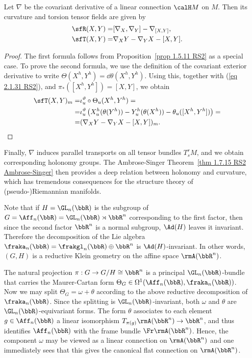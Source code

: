 \begin{prop}[{{\cite[Prop.~2.1.19]{RS2}}}]\label{prop 2.1.19 RS2}
    Let $\nabla$ be the covariant derivative of a linear connection $\calH M$ on $M$. Then its curvature and torsion tensor fields are given by 
    \begin{align}
        \sfR(X,Y)=&[\nabla_X,\nabla_Y]-\nabla_{[X,Y]},\\
        \sfT(X,Y)=&\nabla_X Y-\nabla_Y X-[X,Y].\label{eq 2.1.33 RS2}
    \end{align}
\end{prop}
\begin{proof}
    The first formula follows from Proposition~\ref{prop 1.5.11 RS2} as a special case. To prove the second formula, we use the definition of the covariant exterior derivative to write $\Theta(X^h,Y^h)=\dd\theta(X^h,Y^h)$. Using this, together with (\ref{eq 2.1.31 RS2}), and $\pi_\ast([X^h,Y^h])=[X,Y]$, we obtain 
    \begin{align}
        \sfT(X,Y)_m=&\iota_u^\vartheta\circ \Theta_u(X^h,Y^h)=\\
        =& \iota_u^\vartheta\left(X^h_u(\theta(Y^h))-Y^h_u(\theta(X^h))-\theta_u([X^h,Y^h])\right)=\\
        =&(\nabla_X Y-\nabla_Y X-[X,Y])_m.
    \end{align}
\end{proof}

Finally, $\nabla$ induces parallel transports on all tensor bundles $T^r_s M$, and we obtain corresponding holonomy groups. The Ambrose-Singer Theorem~\ref{thm 1.7.15 RS2 Ambrose-Singer} then provides a deep relation between holonomy and curvature, which has tremendous consequences for the structure theory of (pseudo-)Riemannian manifolds.


\begin{rem}
    Note that if $H=\GL_n(\bbR)$ is the subgroup of $G=\Aff_n(\bbR)=\GL_n(\bbR)\rtimes \bbR^n$ corresponding to the first factor, then since the second factor $\bbR^n$ is a normal subgroup, $\Ad(H)$ leaves it invariant. Therefore the decomposition of the Lie algebra $\fraka_n(\bbR)=\frakgl_n(\bbR)\oplus \bbR^n$ is $\Ad(H)$-invariant. In other words, $(G,H)$ is a reductive Klein geometry on the affine space $\rmA(\bbR^n)$.

    The natural projection $\pi:G\to G\slash H\cong \bbR^n$ is a principal $\GL_n(\bbR)$-bundle that carries the Maurer-Cartan form $\Theta_{G}\in\Omega^1(\Aff_n(\bbR),\fraka_n(\bbR))$. Now we may split $\Theta_G=\omega+\theta$ according to the above reductive decomposition of $\fraka_n(\bbR)$. Since the splitting is $\GL_n(\bbR)$-invariant, both $\omega$ and $\theta$ are $\GL_n(\bbR)$-equivariant forms. The form $\theta$ associates to each element $g\in \Aff_n(\bbR)$ a linear isomorphism $T_{\pi(g)}\rmA(\bbR^n)\to \bbR^n$, and thus identifies $\Aff_n(\bbR)$ with the frame bundle $\Fr \rmA(\bbR^n)$. Hence, the component $\omega$ may be viewed as a linear connection on $\rmA(\bbR^n)$ and one immediately sees that this gives the canonical flat connection on $\rmA(\bbR^n)$.
\end{rem}


